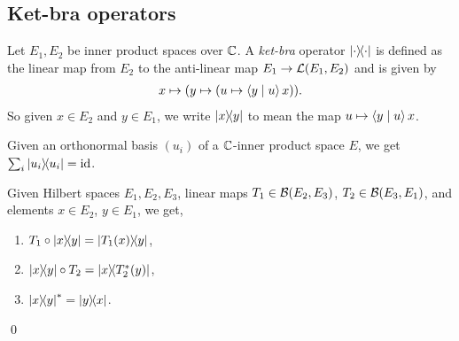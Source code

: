 \subsection{Ket-bra operators}\label{subsec:rank_one}
 Let $E_1,E_2$ be inner product spaces over $\mathbb{C}$. A \textit{ket-bra} operator $\left\lvert\cdot\right\rangle\!\!\left\langle\cdot\right\rvert$ is defined as the linear map from $E_2$ to the anti-linear map $E_1\to\mathcal{L}(E_1,E_2)$ and is given by
 \begin{align*}
  x\mapsto(y\mapsto(u\mapsto\left\langle y \mid u\right\rangle x)).
 \end{align*}
 So given $x\in{E_2}$ and $y\in{E_1}$, we write $\left\lvert x\right\rangle\!\!\left\langle y\right\rvert$ to mean the map $u\mapsto\left\langle y \mid u\right\rangle x$.

 Given an orthonormal basis $(u_i)$ of a $\mathbb{C}$-inner product space $E$, we get $\sum_i\left\lvert u_i\right\rangle\!\!\left\langle u_i\right\rvert=\operatorname{id}$.
 \begin{lemma}\label{linear_map_comp_rank_one}\label{rank_one_comp_linear_map}\label{rank_one.adjoint}\leanok
  Given Hilbert spaces $E_1,E_2,E_3$, linear maps $T_1\in\mathcal{B}(E_2,E_3)$, $T_2\in\mathcal{B}(E_3,E_1)$, and elements $x\in E_2$, $y\in{E_1}$, we get,
  \begin{enumerate}[label=(\roman*)]
   \item $T_1\circ\left\lvert x\right\rangle\!\!\left\langle y\right\rvert=\left\lvert T_1(x)\right\rangle\!\!\left\langle y\right\rvert$,
   \item $\left\lvert x\right\rangle\!\!\left\langle y\right\rvert\circ T_2=\left\lvert x\right\rangle\!\!\left\langle T_2^*(y)\right\rvert$,
   \item $\left\lvert x\right\rangle\!\!\left\langle y\right\rvert^*=\left\lvert y\right\rangle\!\!\left\langle x\right\rvert$.
  \end{enumerate}\qed
 \end{lemma}

